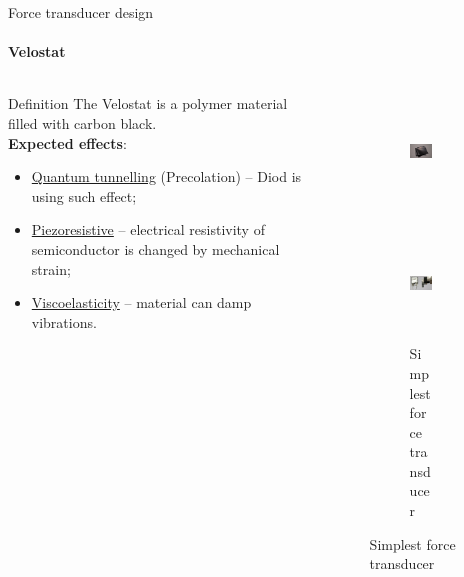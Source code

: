 \documentclass[aspectratio=169,xcolor=table]{beamer}
\begin{document}
\begin{frame}[t]{Force transducer design}
    \framesubtitle{Velostat}
    \vspace{-20pt}
    \begin{columns}[T,onlytextwidth]
        \begin{column}{0.6\textwidth}
            \begin{exampleblock}{Definition}
                The Velostat is a polymer material filled with carbon black.\\
                \textbf{Expected effects}:
                \begin{itemize}
                    \item \underline{Quantum tunnelling} (Precolation) -- Diod is using such effect;
                    \item \underline{Piezoresistive} -- electrical resistivity of semiconductor is changed by mechanical strain;
                    \item \underline{Viscoelasticity} -- material can damp vibrations.
                \end{itemize}
            \end{exampleblock}
        \end{column}
        \begin{column}{0.38\textwidth}
            \vspace{-0.7cm}
            \begin{figure}[H]
                \begin{subfigure}{0.9\textwidth}
                    \centering\includegraphics[height=3cm,width=1\textwidth,keepaspectratio]{velostat_sensor.jpg}
                    \label{fig:velostat_sensor.jpg}
                \end{subfigure}

                \begin{subfigure}{0.9\textwidth}
                    \centering\includegraphics[height=3cm,width=1\textwidth,keepaspectratio]{simplest_sensor.jpg}
                    \caption*{Simplest force transducer}
                    \label{fig:simplest_sensor.jpg}
                \end{subfigure}
            \end{figure}
        \end{column}
    \end{columns}

\end{frame}
\end{document}
